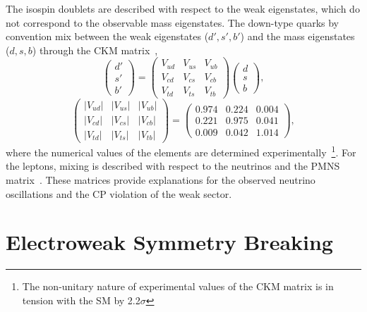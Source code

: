 The isospin doublets are described with respect to the weak eigenstates, which do not correspond to the observable mass eigenstates.
The down-type quarks by convention mix between the weak eigenstates ($d', s', b'$) and the mass eigenstates ($d, s, b$) through the CKM matrix~\cite{cabibbo1963, CPViolationRenormalizableTheory},
\begin{equation}
    \label{eq:ckm_matrix}
    \begin{pmatrix} d' \\ s' \\ b' \end{pmatrix} =
    \begin{pmatrix} V_{ud} & V_{us} & V_{ub} \\ V_{cd} & V_{cs} & V_{cb} \\ V_{td} & V_{ts} & V_{tb} \end{pmatrix} \begin{pmatrix} d \\ s \\ b \end{pmatrix},
\end{equation}
\begin{equation}
    \label{eq:ckm2_matrix}
    \begin{pmatrix} |V_{ud}| & |V_{us}| & |V_{ub}| \\ |V_{cd}| & |V_{cs}| & |V_{cb}| \\ |V_{td}| & |V_{ts}| & |V_{tb}| \end{pmatrix} =
    \begin{pmatrix} 0.974 & 0.224 & 0.004 \\ 0.221 & 0.975 & 0.041 \\ 0.009 & 0.042 & 1.014 \end{pmatrix},
\end{equation}
where the numerical values of the elements are determined experimentally~\cite{ParticleDataGroup}\footnote{The non-unitary nature of experimental values of the CKM matrix is in tension with the SM by 2.2$\sigma$}.
For the leptons, mixing is described with respect to the neutrinos and the PMNS matrix~\cite{Pontecorvo:1957qd, PMNSMatrix}.
These matrices provide explanations for the observed neutrino oscillations and the CP violation of the weak sector.

\section{Electroweak Symmetry Breaking}
\label{sec:higgs}

